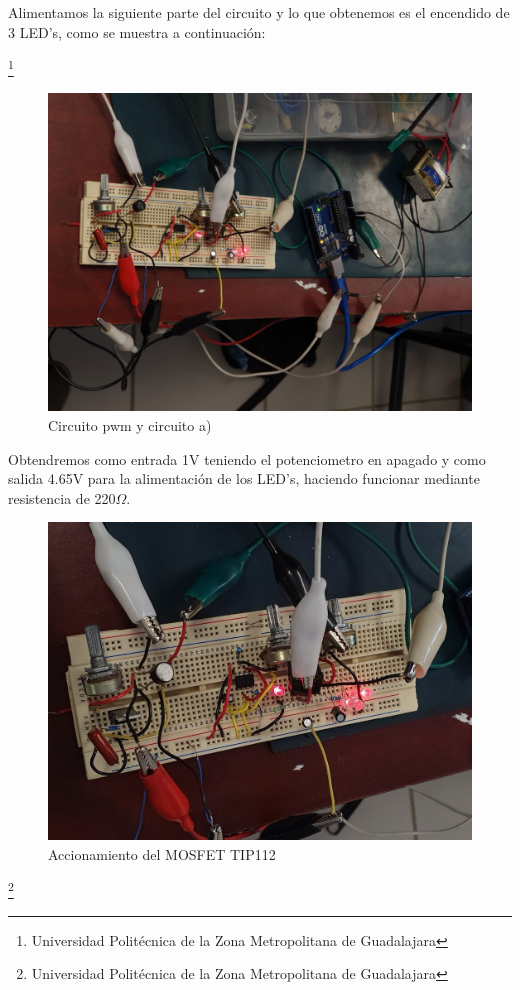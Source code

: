 \documentclass[10pt,a4paper]{article}
\begin{document}
Alimentamos la siguiente parte del circuito y lo que obtenemos es el encendido de 3 LED's, como se muestra a continuación: 

\footnote{Universidad Politécnica de la Zona Metropolitana de Guadalajara}

\newpage
\begin{figure}[hbtp]
\centering
\includegraphics[scale=0.3]{Pictures/pwm2.jpeg}
\caption{Circuito pwm y circuito a)}
\end{figure}

Obtendremos como entrada 1V teniendo el potenciometro en apagado y como salida 4.65V para la alimentación de los LED's, haciendo funcionar mediante resistencia de 220$\Omega$.

\begin{figure}[hbtp]
\centering
\includegraphics[scale=0.3]{Pictures/pwm1.jpeg}
\caption{Accionamiento del MOSFET TIP112}
\end{figure}
\footnote{Universidad Politécnica de la Zona Metropolitana de Guadalajara}
\end{document}
